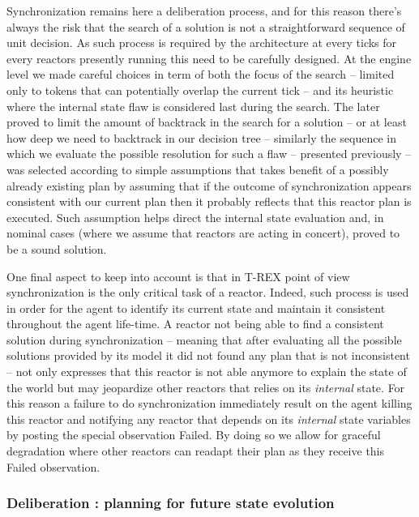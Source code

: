 Synchronization remains here a deliberation process, and for this
reason there's always the risk that the search of a solution is not a
straightforward sequence of unit decision. As such process is required
by the architecture at every ticks for every reactors presently
running this need to be carefully designed. At the engine level we
made careful choices in term of both the focus of the search -- limited
only to tokens that can potentially overlap the current tick -- and
its heuristic where the internal state flaw is considered last during
the search. The later proved to limit the amount of backtrack in the
search for a solution -- or at least how deep we need to backtrack in
our decision tree -- similarly the sequence in which we evaluate the
possible resolution for such a flaw -- presented previously -- was
selected according to simple assumptions that takes benefit of a
possibly already existing plan by assuming that if the outcome of
synchronization appears consistent with our current plan then it
probably reflects that this reactor plan is executed. Such assumption
helps direct the internal state evaluation and, in nominal cases (where
we assume that reactors are acting in concert), proved to be a sound
solution.  

One final aspect to keep into account is that in T-REX point of view
synchronization is the only critical task of a reactor. Indeed, such
process is used in order for the agent to identify its
current state and maintain it consistent throughout the agent
life-time. A reactor not being able to find a consistent solution
during synchronization -- meaning that after evaluating all the
possible solutions provided by its model it did not found any plan
that is not inconsistent -- not only expresses that this reactor is
not able anymore to explain the state of the world but may jeopardize
other reactors that relies on its {\em internal} state. For this
reason a failure to do synchronization immediately result on the
agent killing this reactor and notifying any reactor that depends on
its {\em internal} state variables by posting the special observation
\textsf{Failed}. By doing so we allow for graceful degradation where
other reactors can readapt their plan as they receive this
\textsf{Failed} observation.

\subsubsection{Deliberation : planning for future state evolution}
\label{sec:arch:plan}

